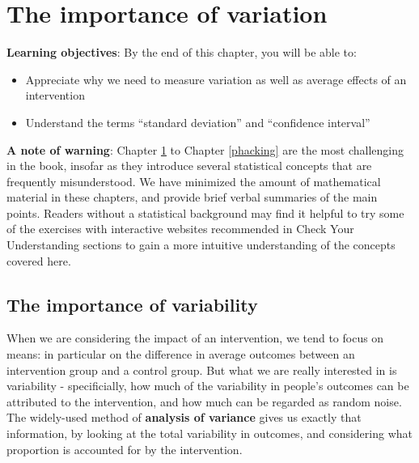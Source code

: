 \documentclass{krantz}
\providecommand{\tightlist}{%
\setlength{\itemsep}{0pt}\setlength{\parskip}{0pt}}
\begin{document}
\hypertarget{variation}{%
\chapter{The importance of variation}\label{variation}}

\textbf{Learning objectives}: By the end of this chapter, you will be able to:

\begin{itemize}
\tightlist
\item
  Appreciate why we need to measure variation as well as average effects of an intervention\\
\item
  Understand the terms ``standard deviation'' and ``confidence interval''
\end{itemize}

\textbf{A note of warning}: Chapter \ref{variation} to Chapter \ref{phacking} are the most challenging in the book, insofar as they introduce several statistical concepts that are frequently misunderstood. We have minimized the amount of mathematical material in these chapters, and provide brief verbal summaries of the main points. Readers without a statistical background may find it helpful to try some of the exercises with interactive websites recommended in Check Your Understanding sections to gain a more intuitive understanding of the concepts covered here.

\hypertarget{the-importance-of-variability}{%
\section{The importance of variability}\label{the-importance-of-variability}}
When we are considering the impact of an intervention, we tend to focus on means: in particular on the difference in average outcomes between an intervention group and a control group. But what we are really interested in is variability - specificially, how much of the variability in people's outcomes can be attributed to the intervention, and how much can be regarded as random noise. The widely-used method of \textbf{analysis of variance} gives us exactly that information, by looking at the total variability in outcomes, and considering what proportion is accounted for by the intervention.
\end{document}
